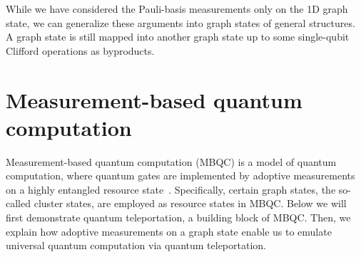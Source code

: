 While we have considered the Pauli-basis measurements only on the 1D graph state, we can generalize these arguments into graph states of general structures.
A graph state is still mapped into another graph state up to some single-qubit Clifford operations as byproducts.



\section{Measurement-based quantum computation}
\label{Sec:MBQC}
Measurement-based quantum computation (MBQC) is a model of quantum computation, where quantum gates are implemented by adoptive measurements on a highly entangled resource state~\cite{MBQC,MBQC_PRA,RaussendorfPhD}. 
Specifically, certain graph states, the so-called cluster states, are employed as resource states in MBQC.
Below we will first demonstrate quantum teleportation, a building block of MBQC.
Then, we explain how adoptive measurements on a graph state enable us to emulate universal quantum computation via quantum teleportation. 

